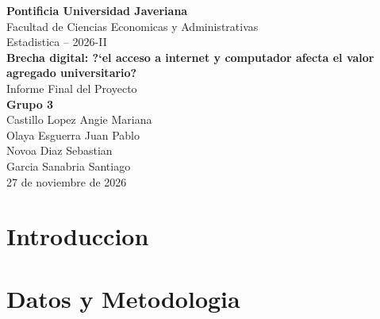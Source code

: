 \documentclass[11pt, a4paper]{article}
\begin{document}
\begin{center}
{\Large \textbf{Pontificia Universidad Javeriana}}\\[0.3cm]
Facultad de Ciencias Economicas y Administrativas\\[0.3cm]
Estadistica -- 2026-II\\[1cm]
{\LARGE \textbf{Brecha digital: ?`el acceso a internet y computador afecta el valor agregado universitario?}}\\[0.5cm]
{\large Informe Final del Proyecto}\\[1cm]
\textbf{Grupo 3}\\[0.3cm]
Castillo Lopez Angie Mariana\\
Olaya Esguerra Juan Pablo\\
Novoa Diaz Sebastian\\
Garcia Sanabria Santiago\\[1cm]
27 de noviembre de 2026
\end{center}

\newpage
\tableofcontents
\newpage

\section{Introduccion}

\section{Datos y Metodologia}
\end{document}
